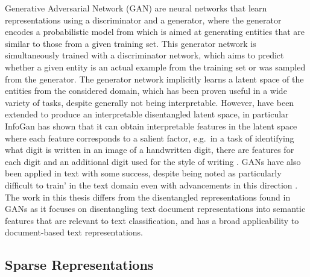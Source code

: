 Generative Adversarial Network (GAN) \cite{Goodfellow2014} are neural networks that learn representations using a discriminator and a generator, where the generator encodes a probabilistic model from which is aimed at generating entities that are similar to those from a given training set. This generator network is simultaneously trained with a discriminator network, which aims to predict whether a given entity is an actual example from the training set or was sampled from the generator.  The generator network implicitly learns a latent space of the entities from the considered domain, which has been proven useful in a wide variety of tasks, despite generally not being interpretable. However,  have been extended to produce an interpretable disentangled latent space, in particular  InfoGan has shown that it can obtain interpretable features in the latent space where each feature corresponds to a salient factor, e.g.\ in a task of identifying what digit is written in an image of a handwritten digit, there are features for each digit and an additional digit used for the style of writing \cite{Chen2016}. GANs have  also been applied in text \cite{Bowman2015, Kim} with some success, despite being noted as particularly difficult to train' in the text domain \cite{Arjovsky2017} even with advancements in this direction \cite{Mescheder2018}. The work in this thesis differs from the disentangled representations found in GANs as it focuses on disentangling text document representations into semantic features that are relevant to text classification, and has a broad applicability to document-based text representations.



\subsection{Sparse Representations}

